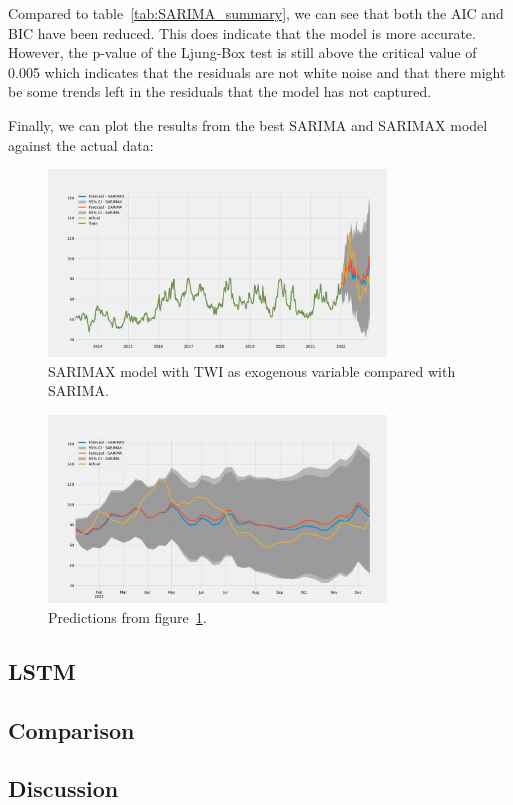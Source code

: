 Compared to table~\ref{tab:SARIMA_summary}, we can see that both the AIC and BIC have been reduced. This does indicate that the model is more accurate. However, the p-value of the Ljung-Box test is still above the critical value of 0.005 which indicates that the residuals are not white noise and that there might be some trends left in the residuals that the model has not captured.

Finally, we can plot the results from the best SARIMA and SARIMAX model against the actual data:
\begin{figure}[H]
    \centering
    \includegraphics[width=0.8\textwidth]{data/Figures/ARIMA/SARIMA-SARIMAX.png}
    \caption{SARIMAX model with TWI as exogenous variable compared with SARIMA.}\label{fig:SARIMA-SARIMAX}
\end{figure}
\begin{figure}[H]
    \centering
    \includegraphics[width=0.8\textwidth]{data/Figures/ARIMA/SARIMA-SARIMAX_no_train.png}
    \caption{Predictions from figure~\ref{fig:SARIMA-SARIMAX}.}\label{fig:SARIMA-SARIMAX_no_train}
\end{figure}


\subsection{LSTM}\label{sec:lstm}

\subsection{Comparison}\label{sec:comparison}

\subsection{Discussion}\label{sec:discussion}